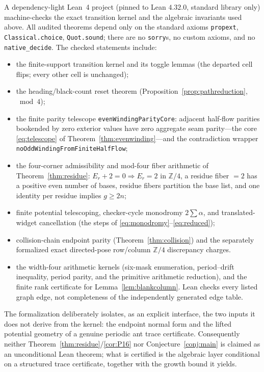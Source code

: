 \documentclass[11pt,reqno]{amsart}
\theoremstyle{plain}
\theoremstyle{definition}
\newcommand{\Z}{\mathbb{Z}}
\newcommand{\growth}{g}
\begin{document}
A dependency-light Lean~4 project (pinned to Lean $4.32.0$, standard library
only) machine-checks the exact transition kernel and the algebraic invariants
used above. All audited theorems depend only on the standard axioms
\texttt{propext}, \texttt{Classical.choice}, \texttt{Quot.sound}; there are no
\texttt{sorry}s, no custom axioms, and no \texttt{native\_decide}. The checked
statements include:
\begin{itemize}[leftmargin=1.4em]
\item the finite-support transition kernel and its toggle lemmas
(the departed cell flips; every other cell is unchanged);
\item the heading/black-count reset theorem
(Proposition~\ref{prop:pathreduction}, $\bmod 4$);
\item the finite parity telescope \texttt{evenWindingParityCore}: adjacent
half-flow parities bookended by zero exterior values have zero aggregate seam
parity---the core \eqref{eq:telescope} of Theorem~\ref{thm:evenwinding}---and the
contradiction wrapper \texttt{noOddWindingFromFiniteHalfFlow};
\item the four-corner admissibility and mod-four fiber arithmetic of
Theorem~\ref{thm:residue}: $E_r+2=0\Rightarrow E_r=2$ in $\Z/4$, a residue
fiber $=2$ has a positive even number of bases, residue fibers partition the base
list, and one identity per residue implies $\growth\ge2n$;
\item finite potential telescoping, checker-cycle monodromy $2\sum\alpha$, and
translated-widget cancellation (the steps of \eqref{eq:monodromy}--\eqref{eq:reduced});
\item collision-chain endpoint parity (Theorem~\ref{thm:collision}) and the
separately formalized exact directed-pose row/column $\Z/4$ discrepancy charges.
\item the width-four arithmetic kernels (six-mask enumeration, period--drift
inequality, period parity, and the primitive arithmetic reduction), and the finite
rank certificate for Lemma~\ref{lem:blankcolumn}.  Lean checks every listed graph
edge, not completeness of the independently generated edge table.
\end{itemize}
The formalization deliberately isolates, as an explicit interface, the two
inputs it does not derive from the kernel: the endpoint normal form and the
lifted potential geometry of a genuine periodic ant trace certificate. Consequently neither
Theorem~\ref{thm:residue}/\ref{cor:P16} nor Conjecture~\ref{conj:main} is claimed
as an unconditional Lean theorem; what is certified is the algebraic layer
conditional on a structured trace certificate, together with the growth bound it
yields.
\end{document}
